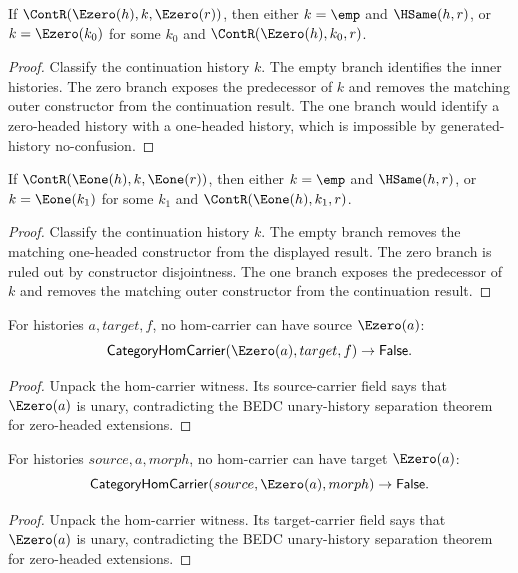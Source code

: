 \begin{theorem}
\label{thm:category-cont-left-e0-result-cases}
If $\ContR(\Ezero(h),k,\Ezero(r))$, then either $k=\emp$ and
$\HSame(h,r)$, or $k=\Ezero(k_0)$ for some $k_0$ and
$\ContR(\Ezero(h),k_0,r)$.
\end{theorem}
\begin{proof}
Classify the continuation history $k$. The empty branch identifies the inner
histories. The zero branch exposes the predecessor of $k$ and removes the
matching outer constructor from the continuation result. The one branch would
identify a zero-headed history with a one-headed history, which is impossible
by generated-history no-confusion.
\end{proof}

\begin{theorem}
\label{thm:category-cont-left-e1-result-cases}
If $\ContR(\Eone(h),k,\Eone(r))$, then either $k=\emp$ and
$\HSame(h,r)$, or $k=\Eone(k_1)$ for some $k_1$ and
$\ContR(\Eone(h),k_1,r)$.
\end{theorem}
\begin{proof}
Classify the continuation history $k$. The empty branch removes the matching
one-headed constructor from the displayed result. The zero branch is ruled out
by constructor disjointness. The one branch exposes the predecessor of $k$ and
removes the matching outer constructor from the continuation result.
\end{proof}

\begin{theorem}
\label{thm:category-hom-carrier-e0-source-absurd}
For histories $a,target,f$, no hom-carrier can have source $\Ezero(a)$:
$$
\mathsf{CategoryHomCarrier}(\Ezero(a),target,f)\to\mathsf{False}.
$$
\end{theorem}
\begin{proof}
Unpack the hom-carrier witness. Its source-carrier field says that
$\Ezero(a)$ is unary, contradicting the BEDC unary-history separation theorem
for zero-headed extensions.
\end{proof}

\begin{theorem}
\label{thm:category-hom-carrier-e0-target-absurd}
For histories $source,a,morph$, no hom-carrier can have target $\Ezero(a)$:
$$
\mathsf{CategoryHomCarrier}(source,\Ezero(a),morph)\to\mathsf{False}.
$$
\end{theorem}
\begin{proof}
Unpack the hom-carrier witness. Its target-carrier field says that
$\Ezero(a)$ is unary, contradicting the BEDC unary-history separation theorem
for zero-headed extensions.
\end{proof}

